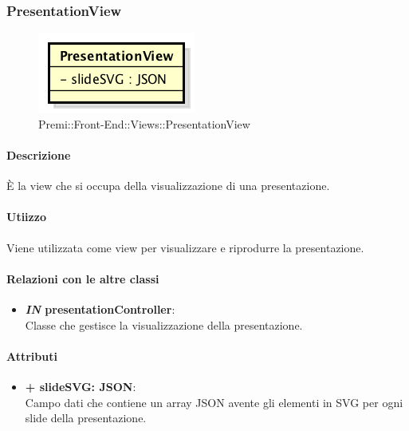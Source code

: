 	
\subsubsection{PresentationView}
	\begin{figure}[h]
		\centering
		\includegraphics[width=0.4\linewidth]{img/premi_front_end_views_presentationview}
		\caption[Premi::Front-End::Views::PresentationView]{Premi::Front-End::Views::PresentationView}
	\end{figure}
	
	\paragraph{Descrizione}
	È la view che si occupa della visualizzazione di una presentazione.
	
	\paragraph{Utiizzo}
	Viene utilizzata come view per visualizzare e riprodurre la presentazione.
	
	\paragraph{Relazioni con le altre classi}
	\begin{itemize}
		\item \textbf{\textit{IN} presentationController}:\\
		Classe che gestisce la visualizzazione della presentazione.
	\end{itemize}
	
	\paragraph{Attributi}
	\begin{itemize}
		\item \textbf{+ slideSVG: JSON}:\\
		Campo dati che contiene un array JSON avente gli elementi in SVG per ogni slide della presentazione.
	\end{itemize}
	
	
